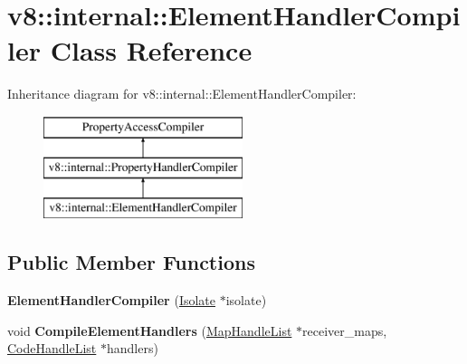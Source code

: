 \hypertarget{classv8_1_1internal_1_1_element_handler_compiler}{}\section{v8\+:\+:internal\+:\+:Element\+Handler\+Compiler Class Reference}
\label{classv8_1_1internal_1_1_element_handler_compiler}
Inheritance diagram for v8\+:\+:internal\+:\+:Element\+Handler\+Compiler\+:\begin{figure}[H]
\begin{center}
\leavevmode
\includegraphics[height=3.000000cm]{classv8_1_1internal_1_1_element_handler_compiler}
\end{center}
\end{figure}
\subsection*{Public Member Functions}
\begin{DoxyCompactItemize}
\item 
\hypertarget{classv8_1_1internal_1_1_element_handler_compiler_a569a52f5bcd937f283efe631758dc3bf}{}{\bfseries Element\+Handler\+Compiler} (\hyperlink{classv8_1_1internal_1_1_isolate}{Isolate} $\ast$isolate)\label{classv8_1_1internal_1_1_element_handler_compiler_a569a52f5bcd937f283efe631758dc3bf}

\item 
\hypertarget{classv8_1_1internal_1_1_element_handler_compiler_ae66502cca58d0f0f1eee553c020c9ead}{}void {\bfseries Compile\+Element\+Handlers} (\hyperlink{classv8_1_1internal_1_1_list}{Map\+Handle\+List} $\ast$receiver\+\_\+maps, \hyperlink{classv8_1_1internal_1_1_list}{Code\+Handle\+List} $\ast$handlers)\label{classv8_1_1internal_1_1_element_handler_compiler_ae66502cca58d0f0f1eee553c020c9ead}

\end{DoxyCompactItemize}
